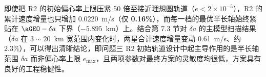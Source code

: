 即使把 R2 的初始偏心率上限压紧 50 倍至接近理想圆轨道（$e < 2\times 10^{-5}$），R2 的累计速度增量也只增加 0.0220~m/s（仅 \textbf{0.16\%}），而每一档的最优半长轴始终紧贴在 $\aGEO - \delta a$ 下界（$-5.895$~km）上。结合第 7.3 节对 $\delta a$ 的主模型扫描结果（$\delta a$ 在 $3 \sim 20$~km 宽范围内变化时，两星合计速度增量变动 0.61~m/s、约 2.3\%），可以得出清晰结论，即问题三 R2 初始轨道设计中起主导作用的是半长轴范围 $\delta a$ 而非偏心率上限 $e_{\max}$，且两项参数对最终方案的灵敏度均很低，方案具有良好的工程稳健性。
